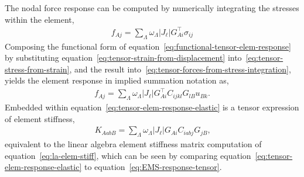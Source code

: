 \documentclass[]             %
{NASA}                       %
\begin{document}
The nodal force response can be computed by numerically integrating
 the stresses within the element,
\begin{eqnarray}
f_{Aj} = \sum_{\Lambda} \omega_{\Lambda} |J_{\ell}| G_{Ai}^{\top} \sigma_{ij}\label{eq:tensor-forces-from-stress-integration}
\end{eqnarray}
Composing the functional form of equation~\ref{eq:functional-tensor-elem-response} by substituting equation~\ref{eq:tensor-strain-from-displacement} into~\ref{eq:tensor-stress-from-strain}, and the result
 into~\ref{eq:tensor-forces-from-stress-integration}, yields the element response in implied summation notation as,
\begin{eqnarray}
f_{Aj} = \sum_{\Lambda} \omega_{\Lambda} |J_{\ell}| G_{Ai}^{\top} C_{ijkl} G_{lB} u_{Bk}\text{.}\label{eq:tensor-elem-response-elastic}
\end{eqnarray}
Embedded within equation~\ref{eq:tensor-elem-response-elastic} is a tensor expression of element stiffness, 
\begin{eqnarray}
K_{AabB} = \sum_{\Lambda}\omega_{\Lambda} |J_{\ell}| G_{Ai} C_{iabj} G_{jB}\text{,}\label{eq:tensor-elem-stiff}
\end{eqnarray}
equivalent to the linear algebra element stiffness matrix computation of
 equation~\ref{eq:la-elem-stiff}, which can be seen by comparing 
 equation~\ref{eq:tensor-elem-response-elastic} to equation~\ref{eq:EMS-response-tensor}.
\end{document}
